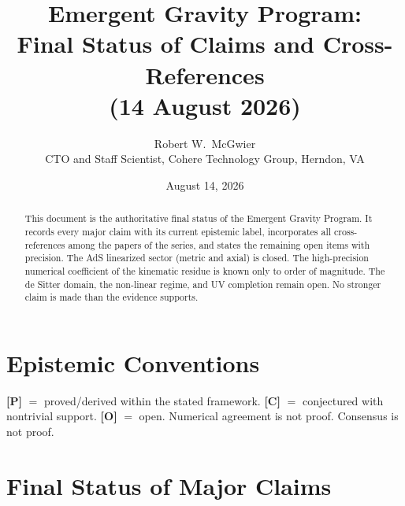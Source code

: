 \documentclass[11pt]{article}
\title{\textbf{Emergent Gravity Program:\\
Final Status of Claims and Cross-References\\
(14 August 2026)}}
\author{Robert W.\ McGwier\\
\small CTO and Staff Scientist, Cohere Technology Group, Herndon, VA}
\date{August 14, 2026}
\newcommand{\pP}{\textbf{[P]}}
\newcommand{\pC}{\textbf{[C]}}
\newcommand{\pO}{\textbf{[O]}}
\begin{document}
\maketitle

\begin{abstract}
\noindent
This document is the authoritative final status of the Emergent Gravity
Program. It records every major claim with its current epistemic label,
incorporates all cross-references among the papers of the series, and
states the remaining open items with precision. The AdS linearized
sector (metric and axial) is closed. The high-precision numerical
coefficient of the kinematic residue is known only to order of
magnitude. The de Sitter domain, the non-linear regime, and UV
completion remain open. No stronger claim is made than the evidence
supports.
\end{abstract}

\section*{Epistemic Conventions}
\pP{} $=$ proved/derived within the stated framework.
\pC{} $=$ conjectured with nontrivial support.
\pO{} $=$ open.
Numerical agreement is not proof. Consensus is not proof.

\section{Final Status of Major Claims}
\end{document}
